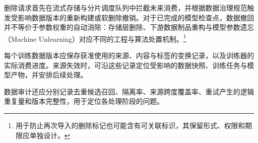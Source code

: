 \documentclass[../textbook.tex]{subfiles}
\begin{document}
删除请求首先在流式存储与分片调度队列中拦截未来消费，并根据数据治理规范触发受影响数据版本的重新构建或软删除撤销。对于已完成的模型检查点，数据撤回并不等价于参数权重的自动消除：存储层删除、下游数据制品重构与模型参数遗忘（Machine Unlearning）对应不同的工程与算法处置机制。\footnote{用于防止再次导入的删除标记也可能含有可关联标识，其保留形式、权限和期限应单独设计。}

\begin{note}[数据版本的追溯记录]
每个训练数据版本应保存获准使用的来源、内容与标签的变换记录，以及训练器的实际消费进度。来源失效时，可沿这些记录定位受影响的数据快照、训练任务与模型产物，并安排后续处理。
\end{note}

数据审计还应分别记录去重候选召回、隔离率、来源跨度覆盖率、重试产生的逻辑重复量和版本完整性，用于定位各处理阶段的问题。

\chapterreferences
\myendchapterdocument
\end{document}
